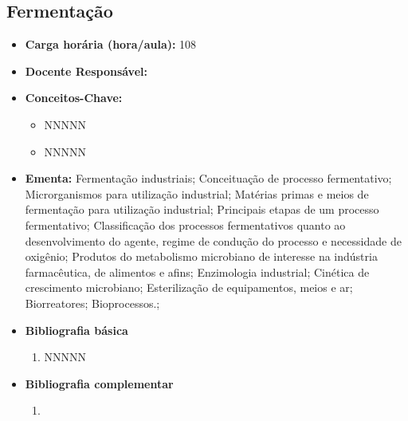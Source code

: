 \documentclass[11pt,fleqn]{book} %
\begin{document}
\subsection{Fermentação}\label{disc:fermentacao}
\begin{itemize}
	\item \textbf{Carga horária (hora/aula):} 108
	\item \textbf{Docente Responsável:}
	\item \textbf{Conceitos-Chave:}
	\begin{itemize}
		\item NNNNN
		\item NNNNN
	\end{itemize}
	\item \textbf{Ementa:} Fermentação industriais;
	Conceituação de processo fermentativo; 
	Microrganismos para utilização industrial; 
	Matérias primas e meios de fermentação para utilização industrial; 
	Principais etapas de um processo fermentativo; 
	Classificação dos processos fermentativos quanto ao desenvolvimento do agente, regime de condução do processo e necessidade de oxigênio;
	Produtos do metabolismo microbiano de interesse na indústria farmacêutica, de alimentos e afins; 
	Enzimologia industrial; 
	Cinética de crescimento microbiano;
	Esterilização de equipamentos, meios e ar;
	Biorreatores;
	Bioprocessos.;
	\item \textbf{Bibliografia básica}
	\begin{enumerate}
		\item NNNNN
	\end{enumerate}
	\item \textbf{Bibliografia complementar}
	\begin{enumerate}
		\item 
	\end{enumerate}	
\end{itemize}

\newpage
\end{document}
